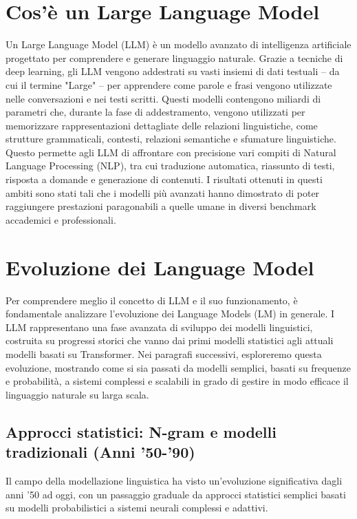 \documentclass[target=mst,aauheader=,style=]{thud}
\begin{document}
\section{Cos’è un Large Language Model}
Un Large Language Model (LLM) è un modello avanzato di intelligenza artificiale progettato per comprendere e generare linguaggio naturale. Grazie a tecniche di deep learning, gli LLM vengono addestrati su vasti insiemi di dati testuali – da cui il termine "Large" – per apprendere come parole e frasi vengono utilizzate nelle conversazioni e nei testi scritti. Questi modelli contengono miliardi di parametri che, durante la fase di addestramento, vengono utilizzati per memorizzare rappresentazioni dettagliate delle relazioni linguistiche, come strutture grammaticali, contesti, relazioni semantiche e sfumature linguistiche.\cite{hadi_2024} Questo permette agli LLM di affrontare con precisione vari compiti di Natural Language Processing (NLP), tra cui traduzione automatica, riassunto di testi, risposta a domande e generazione di contenuti. I risultati ottenuti in questi ambiti sono stati tali che i modelli più avanzati hanno dimostrato di poter raggiungere prestazioni paragonabili a quelle umane in diversi benchmark accademici e professionali.\cite{openai_2024_gpt4_technical_report}

\section{Evoluzione dei Language Model}
Per comprendere meglio il concetto di LLM e il suo funzionamento, è fondamentale analizzare l'evoluzione dei Language Models (LM) in generale. I LLM rappresentano una fase avanzata di sviluppo dei modelli linguistici, costruita su progressi storici che vanno dai primi modelli statistici agli attuali modelli basati su Transformer. Nei paragrafi successivi, esploreremo questa evoluzione, mostrando come si sia passati da modelli semplici, basati su frequenze e probabilità, a sistemi complessi e scalabili in grado di gestire in modo efficace il linguaggio naturale su larga scala.

\subsection{Approcci statistici: N-gram e modelli tradizionali (Anni '50-'90)}
Il campo della modellazione linguistica ha visto un’evoluzione significativa dagli anni ’50 ad oggi, con un passaggio graduale da approcci statistici semplici basati su modelli probabilistici a sistemi neurali complessi e adattivi.
\end{document}
